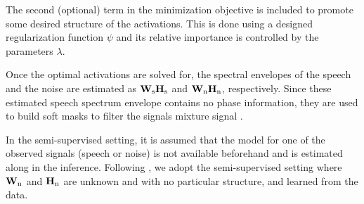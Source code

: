 %
The second (optional) term in the minimization objective is included to promote some desired structure of the activations. This is done using a designed regularization function $\psi$ and its relative importance is controlled by the parameters $\lambda$. 

Once the optimal activations are solved for, the spectral envelopes of the speech and the noise are estimated as $ \bm{\mathrm{W}}_{\mathrm{s}} \bm{\mathrm{H}}_{\mathrm{s}}$ and $ \bm{\mathrm{W}}_{\mathrm{n}} \bm{\mathrm{H}}_{\mathrm{n}}$, respectively. Since these estimated speech spectrum envelope contains no phase information, they are used to build soft masks to filter the signals mixture signal \cite{schmidt07mlsp}.

In the semi-supervised setting, it is assumed that the model for one of the observed signals (speech or noise) is not available beforehand
and is estimated along in the inference.
Following \cite{}, we adopt the semi-supervised setting where $\bm{\mathrm{W}}_{\mathrm{n}}$ and $\bm{\mathrm{H}}_{\mathrm{n}}$ are unknown and with no particular structure, and learned from the data. %


%
%
